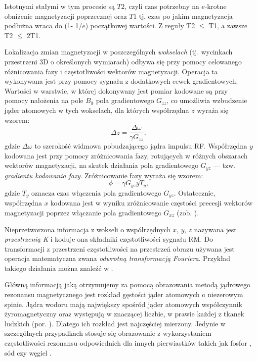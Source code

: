Istotnymi stałymi w tym procesie są $T2$, czyli czas potrzebny na $e$-krotne obniżenie magnetyzacji poprzecznej oraz $T1$ tj. czas po jakim magnetyzacja podłużna wraca do (1- 1/$e$) początkowej wartości. Z reguły T2 $\leq$ T1, a zawsze T2 $\leq$ 2T1.   

Lokalizacja zmian magnetyzacji w poszczególnych \textit{wokselach} (tj. wycinkach przestrzeni 3D o określonych wymiarach) odbywa się przy pomocy celowanego różnicowania fazy i częstotliwości wektorów magnetyzacji. Operacja ta wykonywana jest przy pomocy sygnału z dodatkowych cewek gradientowych. Wartości w warstwie, w której dokonywany jest pomiar kodowane są przy pomocy nałożenia na pole $B_0$ pola gradientowego $G_{zz}$, co umożliwia wzbudzenie jąder atomowych w tych wokselach, dla których współrzędna $z$ wyraża się wzorem:
\begin{equation}
\Delta z = \frac{\Delta \omega}{\gamma G_{zz}},
\end{equation}
gdzie $\Delta \omega$ to szerokość widmowa pobudzającego jądra impulsu RF. Współrzędna $y$ kodowana jest przy pomocy zróżnicowania fazy, rotujących w różnych obszarach wektorów magnetyzacji, na skutek działania pola gradientowego $G_{yz}$ — tzw. \textit{gradientu kodowania fazy}. Zróżnicowanie fazy wyraża się wzorem:
\begin{equation}
\phi = \gamma G_{yz}yT_{y},
\end{equation}
gdzie $T_y$ oznacza czas włączenia pola gradientowego $G_{yz}$. Ostatecznie, współrzędna $x$ kodowana jest w wyniku zróżnicowanie częstości precesji wektorów magnetyzacji poprzez włączanie pola gradientowego $G_{xz}$ (zob. \cite{ObrazowanieMedyczne}). 

Nieprzetworzona informacja z wokseli o współrzędnych $x$, $y$, $z$ nazywana jest \textit{przestrzenią K} i koduje ona składniki częstotliwości sygnału RM. Do transformacji z przestrzeni częstotliwości na przestrzeń obrazu używana jest operacja matematyczna zwana \textit{odwrotną transformacją Fouriera}. Przykład takiego działania można znaleźć w \cite{Q&AinMRI}.

Główną informacją jaką otrzymujemy za pomocą obrazowania metodą jądrowego rezonansu magnetycznego jest rozkład gęstości jąder atomowych o niezerowym spinie. Jądra wodoru mają największy spośród jąder atomowych współczynnik żyromagnetyczny oraz występują w znaczącej liczbie, w prawie każdej z tkanek ludzkich (por. \cite{RM2015}). Dlatego ich rozkład jest najczęściej mierzony. Jedynie w szczególnych przypadkach stosuje się obrazowanie z wykorzystaniem częstotliwości rezonansu odpowiednich dla innych pierwiastków takich jak fosfor \cite{Sun2016}, sód \cite{Summers1991} czy węgiel \cite{Dria2002}. 

